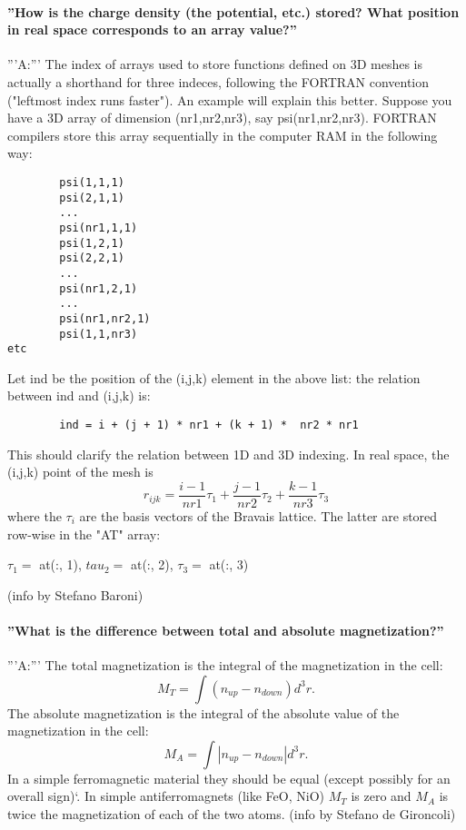 \documentclass[12pt,a4paper]{article}
\begin{document}
\paragraph{ ''How is the charge density (the potential, etc.) stored? What position in real space corresponds to an array value?''}
'''A:''' The index of arrays used to store functions defined on 3D meshes is
actually a shorthand for three indeces, following the FORTRAN convention ("leftmost index runs faster"). An example will explain this better. Suppose you have a 3D array of dimension (nr1,nr2,nr3), say psi(nr1,nr2,nr3). FORTRAN compilers store this array sequentially in the computer RAM in the following way:
\begin{verbatim}
        psi(1,1,1)
        psi(2,1,1)
        ...
        psi(nr1,1,1)
        psi(1,2,1)
        psi(2,2,1)
        ...
        psi(nr1,2,1)
        ...
        psi(nr1,nr2,1)
        psi(1,1,nr3)
etc
\end{verbatim}
Let ind be the position of the (i,j,k) element in the above list: the
relation between ind and (i,j,k) is:
\begin{verbatim}
        ind = i + (j + 1) * nr1 + (k + 1) *  nr2 * nr1
\end{verbatim}
This should clarify the relation between 1D and 3D indexing. In real
space, the (i,j,k) point of the mesh is
$$
r_{ijk}=\frac{i-1}{nr1} \tau_1  +  \frac{j-1}{nr2} \tau_2 +
\frac{k-1}{nr3} \tau_3 
$$
where the $\tau_i$ are the basis vectors of the Bravais lattice. The latter
are stored row-wise in the "AT" array:

$\tau_1 = $ at(:, 1), $ tau_2 = $ at(:, 2), $\tau_3 = $ at(:, 3)

(info by Stefano Baroni)

\paragraph{ ''What is the difference between total and absolute
  magnetization?''} 

'''A:''' The total magnetization is the integral of the magnetization
in the cell: 
$$
M_T = \int (n_{up}-n_{down}) d^3r.
$$
The absolute magnetization is the integral of the absolute value of
the magnetization in the cell:
$$
M_A= \int |n_{up}-n_{down}| d^3r.
$$
In a simple ferromagnetic material they should be equal (except
possibly for an overall sign)`. In simple antiferromagnets (like FeO,
NiO) $M_T$ is zero and $M_A$ is twice the magnetization of each of the
two atoms. (info by Stefano de Gironcoli) 
\end{document}
